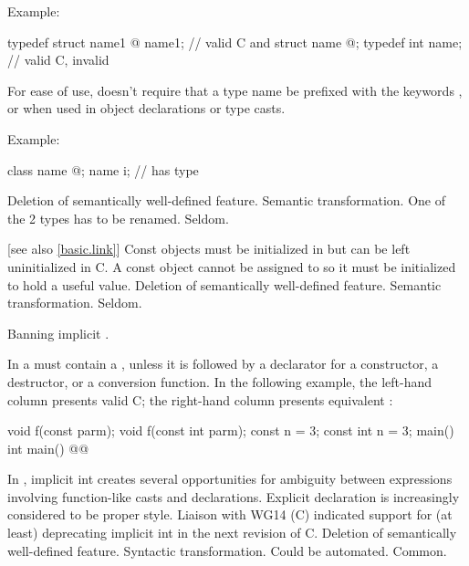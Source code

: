 Example:
\begin{codeblock}
typedef struct name1 { @\commentellip@ } name1;         // valid C and \Cpp{}
struct name { @\commentellip@ };
typedef int name;               // valid C, invalid \Cpp{}
\end{codeblock}

\rationale
For ease of use, \Cpp{} doesn't require that a type name be prefixed
with the keywords ,  or  when used in object
declarations or type casts.

Example:
\begin{codeblock}
class name { @\commentellip@ };
name i;                         //  has type 
\end{codeblock}

\effect
Deletion of semantically well-defined feature.
\difficulty
Semantic transformation.
One of the 2 types has to be renamed.
\howwide
Seldom.

 [see also \ref{basic.link}]
\change Const objects must be initialized in \Cpp{} but can be left uninitialized in C.
\rationale
A const object cannot be assigned to so it must be initialized
to hold a useful value.
\effect
Deletion of semantically well-defined feature.
\difficulty
Semantic transformation.
\howwide
Seldom.

\change Banning implicit .

In \Cpp{} a
must contain a
, unless
it is followed by a declarator for a constructor, a destructor, or a
conversion function.
In the following example, the
left-hand column presents valid C;
the right-hand column presents
equivalent \Cpp{}:

\begin{codeblock}
void f(const parm);            void f(const int parm);
const n = 3;                   const int n = 3;
main()                         int main()
    @\commentellip@                      @\commentellip@
\end{codeblock}

\rationale
In \Cpp{}, implicit int creates several opportunities for
ambiguity between expressions involving function-like
casts and declarations.
Explicit declaration is increasingly considered
to be proper style.
Liaison with WG14 (C) indicated support for (at least)
deprecating implicit int in the next revision of C.
\effect
Deletion of semantically well-defined feature.
\difficulty
Syntactic transformation.
Could be automated.
\howwide
Common.

